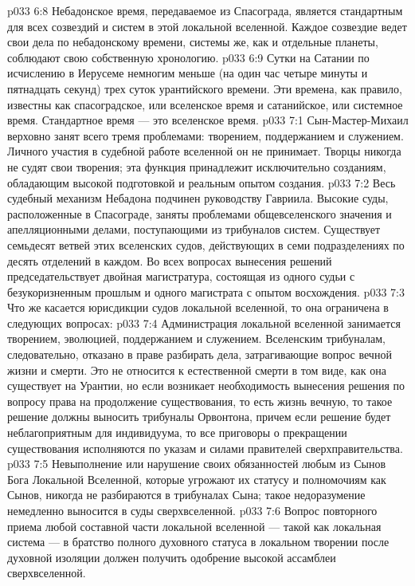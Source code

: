\vs p033 6:8 Небадонское время, передаваемое из Спасограда, является стандартным для всех созвездий и систем в этой локальной вселенной. Каждое созвездие ведет свои дела по небадонскому времени, системы же, как и отдельные планеты, соблюдают свою собственную хронологию.
\vs p033 6:9 Сутки на Сатании по исчислению в Иерусеме немногим меньше (на один час четыре минуты и пятнадцать секунд) трех суток урантийского времени. Эти времена, как правило, известны как спасоградское, или вселенское время и сатанийское, или системное время. Стандартное время --- это вселенское время.
\vs p033 7:1 Сын\hyp{}Мастер\hyp{}Михаил верховно занят всего тремя проблемами: творением, поддержанием и служением. Личного участия в судебной работе вселенной он не принимает. Творцы никогда не судят свои творения; эта функция принадлежит исключительно созданиям, обладающим высокой подготовкой и реальным опытом создания.
\vs p033 7:2 Весь судебный механизм Небадона подчинен руководству Гавриила. Высокие суды, расположенные в Спасограде, заняты проблемами общевселенского значения и апелляционными делами, поступающими из трибуналов систем. Существует семьдесят ветвей этих вселенских судов, действующих в семи подразделениях по десять отделений в каждом. Во всех вопросах вынесения решений председательствует двойная магистратура, состоящая из одного судьи с безукоризненным прошлым и одного магистрата с опытом восхождения.
\vs p033 7:3 Что же касается юрисдикции судов локальной вселенной, то она ограничена в следующих вопросах:
\vs p033 7:4 \bibnobreakspace Администрация локальной вселенной занимается творением, эволюцией, поддержанием и служением. Вселенским трибуналам, следовательно, отказано в праве разбирать дела, затрагивающие вопрос вечной жизни и смерти. Это не относится к естественной смерти в том виде, как она существует на Урантии, но если возникает необходимость вынесения решения по вопросу права на продолжение существования, то есть жизнь вечную, то такое решение должны выносить трибуналы Орвонтона, причем если решение будет неблагоприятным для индивидуума, то все приговоры о прекращении существования исполняются по указам и силами правителей сверхправительства.
\vs p033 7:5 \bibnobreakspace Невыполнение или нарушение своих обязанностей любым из Сынов Бога Локальной Вселенной, которые угрожают их статусу и полномочиям как Сынов, никогда не разбираются в трибуналах Сына; такое недоразумение немедленно выносится в суды сверхвселенной.
\vs p033 7:6 \bibnobreakspace Вопрос повторного приема любой составной части локальной вселенной --- такой как локальная система --- в братство полного духовного статуса в локальном творении после духовной изоляции должен получить одобрение высокой ассамблеи сверхвселенной.
